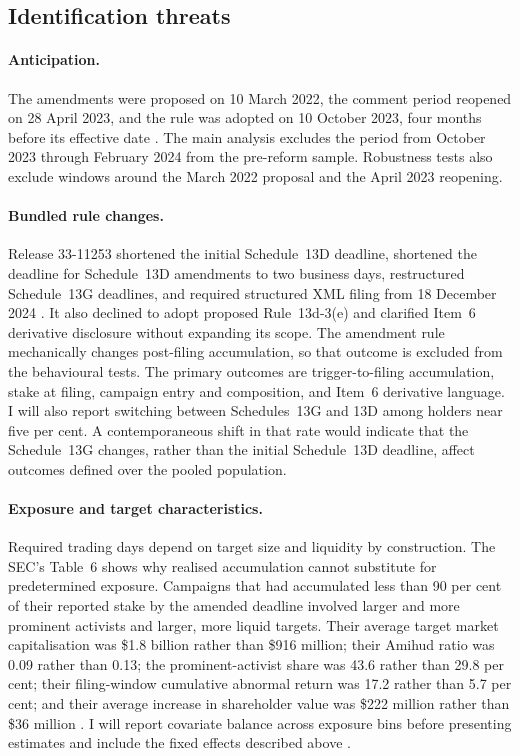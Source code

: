 \subsection{Identification threats}
\label{sec:identification-threats}

\paragraph{Anticipation.}
The amendments were proposed on 10 March 2022, the comment period reopened on
28 April 2023, and the rule was adopted on 10 October 2023, four months before
its effective date \parencite{sec2023modernization}. The main analysis excludes
the period from October 2023 through February 2024 from the pre-reform sample.
Robustness tests also exclude windows around the March 2022 proposal and the
April 2023 reopening.

\paragraph{Bundled rule changes.}
Release 33-11253 shortened the initial Schedule~13D deadline, shortened the
deadline for Schedule~13D amendments to two business days, restructured
Schedule~13G deadlines, and required structured XML filing from 18 December
2024 \parencite{sec2023modernization}. It also declined to adopt proposed
Rule~13d-3(e) and clarified Item~6 derivative disclosure without expanding its
scope. The amendment rule
mechanically changes post-filing accumulation, so that outcome is excluded from
the behavioural tests. The primary outcomes are trigger-to-filing accumulation,
stake at filing, campaign entry and composition, and Item~6 derivative language.
I will also report switching between Schedules~13G and 13D among holders near
five per cent. A contemporaneous shift in that rate would indicate that the
Schedule~13G changes, rather than the initial Schedule~13D deadline, affect
outcomes defined over the pooled population.

\paragraph{Exposure and target characteristics.}
Required trading days depend on target size and liquidity by construction. The
SEC's Table~6 shows why realised accumulation cannot substitute for predetermined
exposure. Campaigns that had accumulated less than 90 per cent of their reported
stake by the amended deadline involved larger and more prominent activists and
larger, more liquid targets. Their average target market capitalisation was
\$1.8 billion rather than \$916 million; their Amihud ratio was 0.09 rather than
0.13; the prominent-activist share was 43.6 rather than 29.8 per cent; their
filing-window cumulative abnormal return was 17.2 rather than 5.7 per cent; and
their average increase in shareholder value was \$222 million rather than
\$36 million \parencite{sec2023modernization}. I will report covariate balance
across exposure bins before presenting estimates and include the fixed effects
described above \parencite{collindufresnefos2015,collindufresnefos2016,
edmansfangzur2013}.

